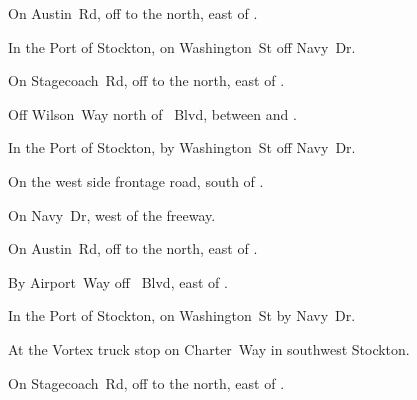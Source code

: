 
\begin{LocationList}

On Austin~Rd, off  to the north, east of .

In the Port of Stockton, on Washington~St off Navy~Dr.

On Stagecoach~Rd, off  to the north, east of .

Off Wilson~Way north of \MLKing~Blvd, between   and  .

In the Port of Stockton, by Washington~St off Navy~Dr.

On the west side  frontage road, south of .

On Navy~Dr, west of the freeway.

On Austin~Rd, off  to the north, east of .

\Location{\RecruitmentAgency \Recruitment}
By Airport~Way off \MLKing~Blvd, east of  .

In the Port of Stockton, on Washington~St by Navy~Dr.

At the Vortex truck stop on  Charter~Way in southwest Stockton.

On Stagecoach~Rd, off  to the north, east of .

\end{LocationList}
